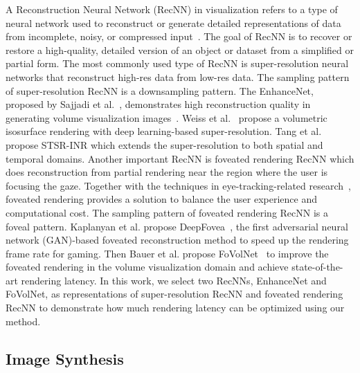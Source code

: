 A Reconstruction Neural Network (RecNN) in visualization refers to a type of neural network used to reconstruct or generate detailed representations of data from incomplete, noisy, or compressed input~\cite{10.1007/s10462-022-10147-y, cao2021video}. The goal of RecNN is to recover or restore a high-quality, detailed version of an object or dataset from a simplified or partial form.
The most commonly used type of RecNN is super-resolution neural networks that reconstruct high-res data from low-res data. The sampling pattern of super-resolution RecNN is a downsampling pattern. The EnhanceNet, proposed by Sajjadi et al.~\cite{8237743}, demonstrates high reconstruction quality in generating volume visualization images~\cite{9264699}. Weiss et al.~\cite{8918030} propose a volumetric isosurface rendering with deep learning-based super-resolution. Tang et al.~\cite{TANG2024103874} propose STSR-INR which extends the super-resolution to both spatial and temporal domains. Another important RecNN is foveated rendering RecNN which does reconstruction from partial rendering near the region where the user is focusing the gaze. Together with the techniques in eye-tracking-related research~\cite{sundstedt2022systematic, 8900970}, foveated rendering provides a solution to balance the user experience and computational cost. The sampling pattern of foveated rendering RecNN is a foveal pattern. Kaplanyan et al. propose DeepFovea~\cite{10.1145/3355089.3356557}, the first adversarial neural network (GAN)-based foveated reconstruction method to speed up the rendering frame rate for gaming. Then Bauer et al. propose FoVolNet~\cite{9903564}  to improve the foveated rendering in the volume visualization domain and achieve state-of-the-art rendering latency. In this work, we select two RecNNs, EnhanceNet and FoVolNet, as representations of super-resolution RecNN and foveated rendering RecNN to demonstrate how much rendering latency can be optimized using our method.

\subsection{Image Synthesis}

